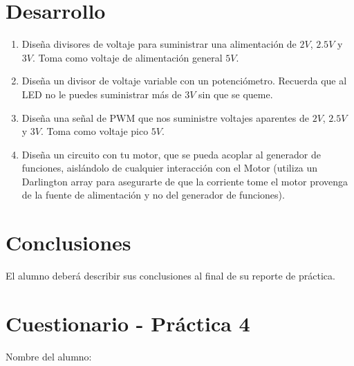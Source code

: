 
\section{Desarrollo}

	\begin{enumerate}
		\item Diseña divisores de voltaje para suministrar una alimentación de $2 V$, $2.5 V$ y $3 V$. Toma como voltaje de alimentación general $5 V$.
		\item Diseña un divisor de voltaje variable con un potenciómetro. Recuerda que al LED no le puedes suministrar más de $3 V$ sin que se queme.
		\item Diseña una señal de PWM que nos suministre voltajes aparentes de $2 V$, $2.5 V$ y $3 V$. Toma como voltaje pico $5 V$.
		\item Diseña un circuito con tu motor, que se pueda acoplar al generador de funciones, aislándolo de cualquier interacción con el Motor (utiliza un Darlington array para asegurarte de que la corriente tome el motor provenga de la fuente de alimentación y no del generador de funciones).
	\end{enumerate}



\section{Conclusiones}

	El alumno deberá describir sus conclusiones al final de su reporte de práctica.

\begin{center}
	\huge \textthing
\end{center}


\clearpage
\section{Cuestionario - Práctica 4}
	Nombre del alumno: \\[0.2cm]
	\horrule{0.5pt} \\[0.2cm] %

